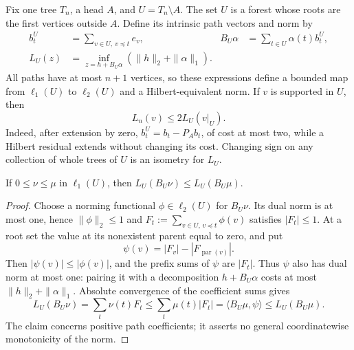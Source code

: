 Fix one tree \(T_n\), a head \(A\), and \(U=T_n\setminus A\).
The set \(U\) is a forest whose roots are the first vertices outside
\(A\). Define its intrinsic path vectors and norm by
\begin{align*}
 b_t^U&=\sum_{v\in U,\ v\preceq t}e_v,
 &B_U\alpha&=\sum_{t\in U}\alpha(t)b_t^U,\\
 L_U(z)&=\inf_{z=h+B_U\alpha}(\|h\|_2+\|\alpha\|_1).
\end{align*}
All paths have at most \(n+1\) vertices, so these expressions define a
bounded map from \(\ell_1(U)\) to \(\ell_2(U)\) and a Hilbert-equivalent
norm. If \(v\) is supported in \(U\), then
\begin{equation}\label{eq:linear-forest-comparison}
 L_n(v)\le2L_U(v|_U).
\end{equation}
Indeed, after extension by zero, \(b_t^U=b_t-P_A b_t\), of cost at most
two, while a Hilbert residual extends without changing its cost. Changing
sign on any collection of whole trees of \(U\) is an isometry for \(L_U\).

\begin{lemma}
\label{lem:linear-positive-monotonicity}
If \(0\le\nu\le\mu\) in \(\ell_1(U)\), then
\(L_U(B_U\nu)\le L_U(B_U\mu)\).
\end{lemma}
\begin{proof}
Choose a norming functional \(\phi\in\ell_2(U)\) for \(B_U\nu\).
Its dual norm is at most one, hence
\(\|\phi\|_2\le1\) and
\(F_t:=\sum_{v\in U,\,v\preceq t}\phi(v)\) satisfies \(|F_t|\le1\).
At a root set the value at its nonexistent parent equal to zero, and put
\[
 \psi(v)=|F_v|-|F_{\operatorname{par}(v)}|.
\]
Then \(|\psi(v)|\le|\phi(v)|\), and the prefix sums of \(\psi\) are
\(|F_t|\). Thus \(\psi\) also has dual norm at most one: pairing it
with a decomposition \(h+B_U\alpha\) costs at most
\(\|h\|_2+\|\alpha\|_1\). Absolute convergence of the coefficient
sums gives
\[
 L_U(B_U\nu)=\sum_t\nu(t)F_t
 \le\sum_t\mu(t)|F_t|
 =\langle B_U\mu,\psi\rangle\le L_U(B_U\mu).
\]
The claim concerns positive path coefficients; it asserts no general
coordinatewise monotonicity of the norm.
\end{proof}

